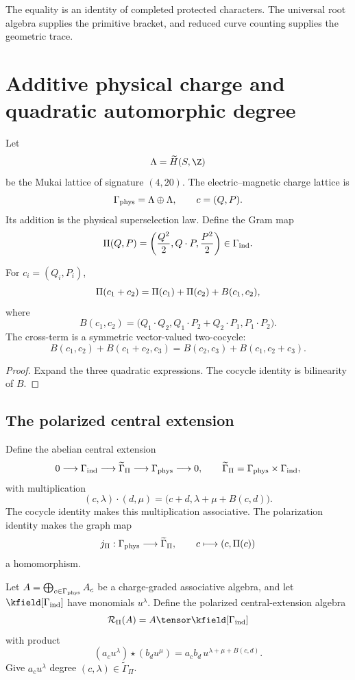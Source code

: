 The equality is an identity of completed protected characters.  The universal root algebra supplies the primitive bracket, and reduced curve counting supplies the geometric trace.

\chapter{Additive physical charge and quadratic automorphic degree}
Let
\[
 \Lam=\widetilde H(S,\Z)
\]
be the Mukai lattice of signature $(4,20)$. The electric--magnetic charge lattice is
\[
 \Gamma_{\mathrm{phys}}=\Lambda\oplus\Lambda,
 \qquad c=(Q,P).
\]
Its addition is the physical superselection law. Define the Gram map
\[
 \Pi(Q,P)=
 \left(\frac{Q^2}{2},Q\cdot P,\frac{P^2}{2}\right)
 \in\Gamma_{\mathrm{ind}}.
\]

\begin{proposition}
For $c_i=(Q_i,P_i)$,
\[
 \Pi(c_1+c_2)=\Pi(c_1)+\Pi(c_2)+B(c_1,c_2),
\]
where
\[
 B(c_1,c_2)=
 \bigl(Q_1\cdot Q_2,
 Q_1\cdot P_2+Q_2\cdot P_1,
 P_1\cdot P_2\bigr).
\]
The cross-term is a symmetric vector-valued two-cocycle:
\[
 B(c_1,c_2)+B(c_1+c_2,c_3)
 =B(c_2,c_3)+B(c_1,c_2+c_3).
\]
\end{proposition}
\begin{proof}
Expand the three quadratic expressions. The cocycle identity is bilinearity of $B$.
\end{proof}

\section{The polarized central extension}
Define the abelian central extension
\[
 0\longrightarrow\Gamma_{\mathrm{ind}}\longrightarrow
 \widetilde\Gamma_\Pi
 \longrightarrow\Gamma_{\mathrm{phys}}\longrightarrow0,
 \qquad
 \widetilde\Gamma_\Pi=\Gamma_{\mathrm{phys}}\times\Gamma_{\mathrm{ind}},
\]
with multiplication
\[
 (c,\lambda)\cdot(d,\mu)
 =\bigl(c+d,\lambda+\mu+B(c,d)\bigr).
\]
The cocycle identity makes this multiplication associative. The polarization identity makes the graph map
\[
 j_\Pi:\Gamma_{\mathrm{phys}}\longrightarrow\widetilde\Gamma_\Pi,
 \qquad c\longmapsto(c,\Pi(c))
\]
a homomorphism.

Let $A=\bigoplus_{c\in\Gamma_{\mathrm{phys}}}A_c$ be a charge-graded associative algebra, and let $\kfield[\Gammaind]$ have monomials $u^\lambda$. Define the polarized central-extension algebra
\[
 \mathcal R_\Pi(A)=A\tensor\kfield[\Gammaind]
\]
with product
\[
 (a_cu^\lambda)\star(b_du^\mu)
 =a_cb_d\,u^{\lambda+\mu+B(c,d)}.
\]
Give $a_cu^\lambda$ degree $(c,\lambda)\in\widetilde\Gamma_\Pi$.

